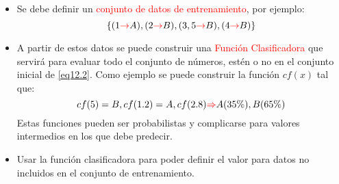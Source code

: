\documentclass{book}
\begin{document}
\begin{itemize}
    \item Se debe definir un \textcolor{red}{conjunto de datos de entrenamiento}, por ejemplo:
    \begin{equation}\label{eq12.2}\{(1\textcolor{red}{\rightarrow} A),(2\textcolor{red}{\rightarrow}B),(3,5\textcolor{red}{\rightarrow} B),(4\textcolor{red}{\rightarrow} B)\}\end{equation}
    \item A partir de estos datos se puede construir una \textcolor{red}{Función Clasificadora} que servirá para evaluar todo el conjunto de números, estén o no en el conjunto inicial de \ref{eq12.2}. Como ejemplo se puede construir la función $cf(x)$ tal que:
    \begin{equation}\label{eq12.3}cf(5)=B, cf(1.2)=A, cf(2.8)\textcolor{red}{\Rightarrow} A (35\%), B (65\%)\end{equation}
    Estas funciones pueden ser probabilistas y complicarse para valores intermedios en los que debe predecir.
    \item Usar la función clasificadora para poder definir el valor para datos no incluidos en el conjunto de entrenamiento. 
\end{itemize}
%
%
\end{document}
